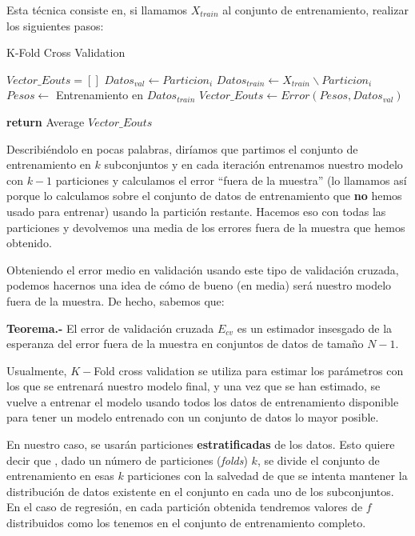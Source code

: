 \documentclass[a4paper, 20pt]{article}
\begin{document}
Esta técnica consiste en, si llamamos $X_{train}$ al conjunto de entrenamiento, realizar los siguientes pasos:
\begin{algorithm}[H]
  \caption{K-Fold Cross Validation}
  \begin{algorithmic}[1]
  \State $Vector\_Eouts = []$
    \State $ Datos_{val} \gets Particion_i$
    \State $ Datos_{train} \gets X_{train} \backslash Particion _i$
    \State $ Pesos \gets $ Entrenamiento en $Datos_{train}$
    \State $ Vector\_Eouts \gets Error(Pesos, Datos_{val})$

  \EndFor

  \State \textbf{return} Average $Vector\_Eouts$
  
  \end{algorithmic}
\end{algorithm}

Describiéndolo en pocas palabras, diríamos que partimos el conjunto de entrenamiento en $k$ subconjuntos y en cada iteración entrenamos nuestro modelo
con $k-1$ particiones y calculamos el error ``fuera de la muestra'' (lo llamamos así porque lo calculamos sobre el conjunto de datos de entrenamiento que \textbf{no} hemos usado para entrenar) usando la partición restante. Hacemos eso con todas las particiones y devolvemos una media de
los errores fuera de la muestra que hemos obtenido.

Obteniendo el error medio en validación usando este tipo de validación cruzada, podemos hacernos una idea de cómo de bueno (en media) será nuestro modelo fuera de la muestra. De hecho, sabemos que:

\textbf{Teorema.-} El error de validación cruzada $E_{cv}$ es un estimador insesgado de la esperanza del error fuera de la muestra en conjuntos de datos de tamaño $N-1$.

Usualmente, $K-$Fold cross validation se utiliza para estimar los parámetros con los que se entrenará nuestro modelo final, y una vez que se han estimado, se vuelve a entrenar el modelo usando
todos los datos de entrenamiento disponible para tener un modelo entrenado con un conjunto de datos lo mayor posible.


En nuestro caso, se usarán particiones \textbf{estratificadas} de los datos. Esto quiere decir que , dado un número de particiones (\emph{folds}) $k$, se divide el conjunto de entrenamiento en esas $k$ particiones con la salvedad de que se intenta mantener la distribución de datos existente en el conjunto en cada uno de los subconjuntos. En el caso de regresión, en cada partición obtenida tendremos valores de $f$ distribuidos como los tenemos en el conjunto de entrenamiento completo.
\end{document}
